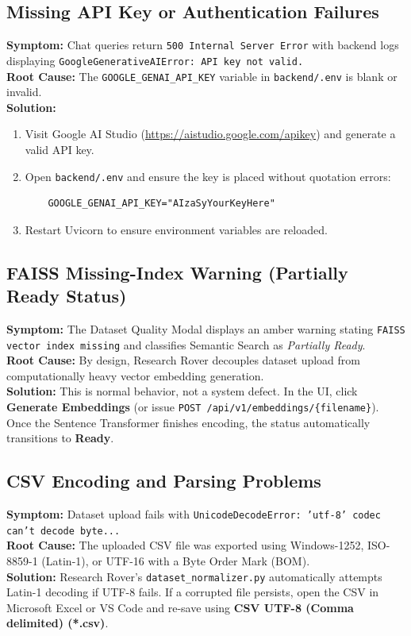 \subsection{Missing API Key or Authentication Failures}
\textbf{Symptom:} Chat queries return \texttt{500 Internal Server Error} with backend logs displaying \texttt{GoogleGenerativeAIError: API key not valid.}\\
\textbf{Root Cause:} The \texttt{GOOGLE\_GENAI\_API\_KEY} variable in \texttt{backend/.env} is blank or invalid.\\
\textbf{Solution:}
\begin{enumerate}
    \item Visit Google AI Studio (\url{https://aistudio.google.com/apikey}) and generate a valid API key.
    \item Open \texttt{backend/.env} and ensure the key is placed without quotation errors:
    \begin{lstlisting}
    GOOGLE_GENAI_API_KEY="AIzaSyYourKeyHere"
    \end{lstlisting}
    \item Restart Uvicorn to ensure environment variables are reloaded.
\end{enumerate}

\subsection{FAISS Missing-Index Warning (Partially Ready Status)}
\textbf{Symptom:} The Dataset Quality Modal displays an amber warning stating \texttt{FAISS vector index missing} and classifies Semantic Search as \textit{Partially Ready}.\\
\textbf{Root Cause:} By design, Research Rover decouples dataset upload from computationally heavy vector embedding generation.\\
\textbf{Solution:} This is normal behavior, not a system defect. In the UI, click \textbf{Generate Embeddings} (or issue \texttt{POST /api/v1/embeddings/\{filename\}}). Once the Sentence Transformer finishes encoding, the status automatically transitions to \textbf{Ready}.

\subsection{CSV Encoding and Parsing Problems}
\textbf{Symptom:} Dataset upload fails with \texttt{UnicodeDecodeError: 'utf-8' codec can't decode byte...}\\
\textbf{Root Cause:} The uploaded CSV file was exported using Windows-1252, ISO-8859-1 (Latin-1), or UTF-16 with a Byte Order Mark (BOM).\\
\textbf{Solution:} Research Rover's \texttt{dataset\_normalizer.py} automatically attempts Latin-1 decoding if UTF-8 fails. If a corrupted file persists, open the CSV in Microsoft Excel or VS Code and re-save using \textbf{CSV UTF-8 (Comma delimited) (*.csv)}.
